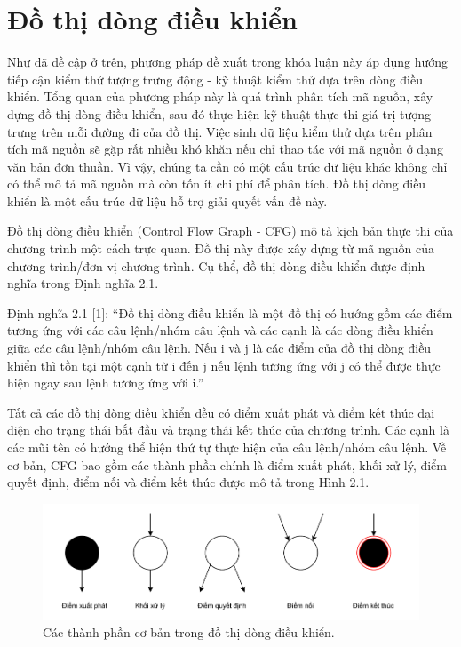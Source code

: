 \section{Đồ thị dòng điều khiển}

Như đã đề cập ở trên, phương pháp đề xuất trong khóa luận này áp dụng hướng tiếp
cận kiểm thử tượng trưng động - kỹ thuật kiểm thử dựa trên dòng điều khiển. Tổng quan
của phương pháp này là quá trình phân tích mã nguồn, xây dựng đồ thị dòng điều khiển,
sau đó thực hiện kỹ thuật thực thi giá trị tượng trưng trên mỗi đường đi của đồ thị. Việc
sinh dữ liệu kiểm thử dựa trên phân tích mã nguồn sẽ gặp rất nhiều khó khăn nếu chỉ
thao tác với mã nguồn ở dạng văn bản đơn thuần. Vì vậy, chúng ta cần có một cấu trúc
dữ liệu khác không chỉ có thể mô tả mã nguồn mà còn tốn ít chi phí để phân tích. Đồ thị
dòng điều khiển là một cấu trúc dữ liệu hỗ trợ giải quyết vấn đề này.

Đồ thị dòng điều khiển (Control Flow Graph - CFG) mô tả kịch bản thực thi của
chương trình một cách trực quan. Đồ thị này được xây dựng từ mã nguồn của chương trình/đơn vị chương trình. Cụ thể, đồ thị dòng điều khiển được định nghĩa trong Định
nghĩa 2.1.

Định nghĩa 2.1 [1]: “Đồ thị dòng điều khiển là một đồ thị có hướng gồm các điểm
tương ứng với các câu lệnh/nhóm câu lệnh và các cạnh là các dòng điều khiển giữa các
câu lệnh/nhóm câu lệnh. Nếu i và j là các điểm của đồ thị dòng điều khiển thì tồn tại
một cạnh từ i đến j nếu lệnh tương ứng với j có thể được thực hiện ngay sau lệnh tương
ứng với i.”

Tất cả các đồ thị dòng điều khiển đều có điểm xuất phát và điểm kết thúc đại diện
cho trạng thái bắt đầu và trạng thái kết thúc của chương trình. Các cạnh là các mũi tên có
hướng thể hiện thứ tự thực hiện của câu lệnh/nhóm câu lệnh. Về cơ bản, CFG bao gồm
các thành phần chính là điểm xuất phát, khối xử lý, điểm quyết định, điểm nối và điểm
kết thúc được mô tả trong Hình 2.1.

\begin{figure}[H]
	\includegraphics[width=1\columnwidth]{figures/c2/c2_cfg_point.drawio.pdf}
	\centering
	\caption{Các thành phần cơ bản trong đồ thị dòng điều khiển.}
	\label{img:background_cfg_point}
\end{figure}

